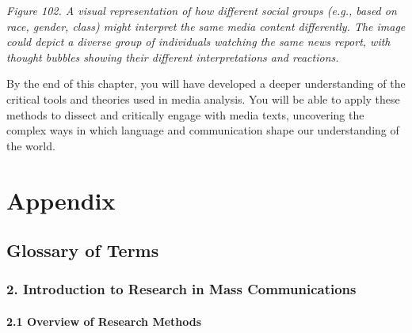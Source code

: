 \documentclass[
]{book}
\begin{document}
\emph{Figure 102. A visual representation of how different social groups (e.g., based on race, gender, class) might interpret the same media content differently. The image could depict a diverse group of individuals watching the same news report, with thought bubbles showing their different interpretations and reactions.}

By the end of this chapter, you will have developed a deeper understanding of the critical tools and theories used in media analysis. You will be able to apply these methods to dissect and critically engage with media texts, uncovering the complex ways in which language and communication shape our understanding of the world.

\chapter*{Appendix}\label{appendix-1}

\section*{Glossary of Terms}\label{glossary-of-terms}

\subsection*{\texorpdfstring{2. \textbf{Introduction to Research in Mass Communications}}{2. Introduction to Research in Mass Communications}}\label{introduction-to-research-in-mass-communications-1}

\subsubsection*{\texorpdfstring{\textbf{2.1 Overview of Research Methods}}{2.1 Overview of Research Methods}}\label{overview-of-research-methods-1}
\end{document}
